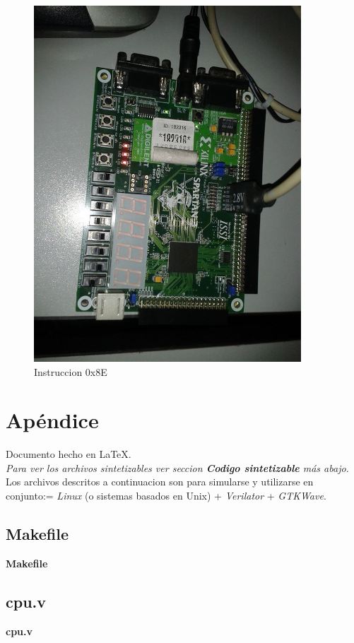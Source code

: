 \documentclass[11pt,letterpaper]{article} %
\begin{document}
\begin{figure}[H]
  \centering
  \includegraphics[width=10cm]{figures/3.jpg}
  \caption{Instruccion 0x8E}
\end{figure}


\section{Apéndice}
Documento hecho en \LaTeX . \\
\emph
{
  Para ver los archivos sintetizables ver seccion \textbf{Codigo
    sintetizable} más abajo.
} \\
Los archivos descritos a continuacion son para simularse y utilizarse en
conjunto:= \emph{Linux} (o sistemas basados en Unix) + \emph{Verilator} +
\emph{GTKWave}.\\

\subsection{Makefile}
\textbf{Makefile}


\subsection{cpu.v}
\textbf{cpu.v}

\end{document}
